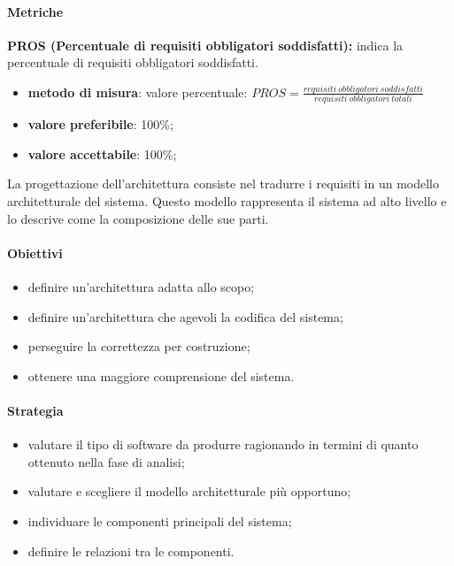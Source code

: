 \paragraph{Metriche}
\textbf{PROS (Percentuale di requisiti obbligatori soddisfatti):} indica la percentuale di requisiti obbligatori soddisfatti.
\begin{itemize}
    \item \textbf{metodo di misura}: valore percentuale: $PROS = \frac{requisiti \ obbligatori \ soddisfatti}{requisiti \ obbligatori \ totali}$
    \item \textbf{valore preferibile}: 100\%;
    \item \textbf{valore accettabile}: 100\%;
\end{itemize}
La progettazione dell'architettura consiste nel tradurre i requisiti in un modello architetturale del sistema. Questo modello rappresenta 
il sistema ad alto livello e lo descrive come la composizione delle sue parti.
\paragraph{Obiettivi}
\begin{itemize}
    \item definire un'architettura adatta allo scopo;
    \item definire un'architettura che agevoli la codifica del sistema;
    \item perseguire la correttezza per costruzione;
    \item ottenere una maggiore comprensione del sistema.
\end{itemize}
\paragraph{Strategia}
\begin{itemize}
    \item valutare il tipo di software da produrre ragionando in termini di quanto ottenuto nella fase di analisi;
    \item valutare e scegliere il modello architetturale più opportuno;
    \item individuare le componenti principali del sistema;
    \item definire le relazioni tra le componenti. 
\end{itemize}
